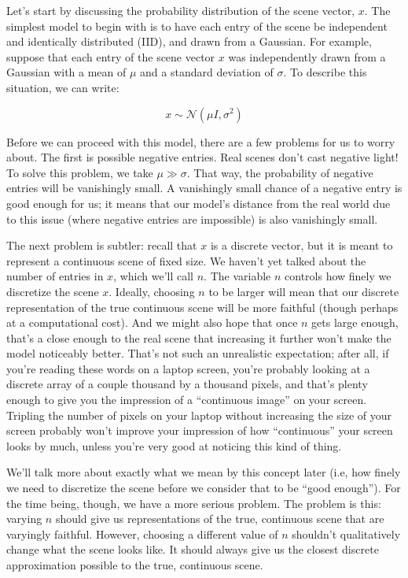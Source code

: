 Let's start by discussing the probability distribution of the scene vector, $x$. The simplest model to begin with is to have each entry of the scene be independent and identically distributed (IID), and drawn from a Gaussian. For example, suppose that each entry of the scene vector $x$ was independently drawn from a Gaussian with a mean of $\mu$ and a standard deviation of $\sigma$. To describe this situation, we can write:

$$x \sim \mathcal{N}(\mu I, \sigma^2)$$

Before we can proceed with this model, there are a few problems for us to worry about. The first is possible negative entries. Real scenes don't cast negative light! To solve this problem, we take $\mu \gg \sigma$. That way, the probability of negative entries will be vanishingly small. A vanishingly small chance of a negative entry is good enough for us; it means that our model's distance from the real world due to this issue (where negative entries are impossible) is also vanishingly small.

The next problem is subtler: recall that $x$ is a discrete vector, but it is meant to represent a continuous scene of fixed size. We haven't yet talked about the number of entries in $x$, which we'll call $n$. The variable $n$ controls how finely we discretize the scene $x$. Ideally, choosing $n$ to be larger will mean that our discrete representation of the true continuous scene will be more faithful (though perhaps at a computational cost). And we might also hope that once $n$ gets large enough, that's a close enough to the real scene that increasing it further won't make the model noticeably better. That's not such an unrealistic expectation; after all, if you're reading these words on a laptop screen, you're probably looking at a discrete array of a couple thousand by a thousand pixels, and that's plenty enough to give you the impression of a ``continuous image'' on your screen. Tripling the number of pixels on your laptop without increasing the size of your screen probably won't improve your impression of how ``continuous'' your screen looks by much, unless you're very good at noticing this kind of thing.

We'll talk more about exactly what we mean by this concept later (i.e, how finely we need to discretize the scene before we consider that to be ``good enough''). For the time being, though, we have a more serious problem. The problem is this: varying $n$ should give us representations of the true, continuous scene that are varyingly faithful. However, choosing a different value of $n$ shouldn't qualitatively change what the scene looks like. It should always give us the closest discrete approximation possible to the true, continuous scene.

